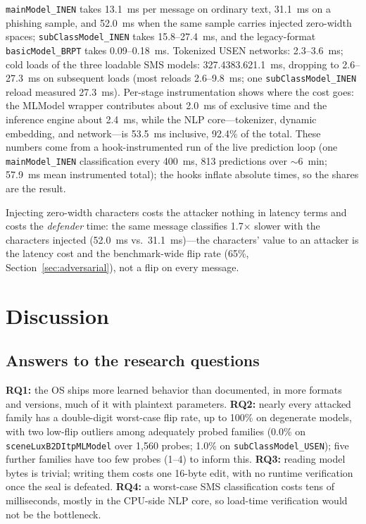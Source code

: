 \documentclass[letterpaper,twocolumn,10pt]{article}
\begin{document}
\texttt{mainModel\_}\allowbreak\texttt{INEN} takes 13.1~ms per message on ordinary text,
31.1~ms on a phishing sample, and 52.0~ms when the same sample carries
injected zero-width spaces; \texttt{subClassModel\_}\allowbreak\texttt{INEN} takes
15.8--27.4~ms, and the legacy-format \texttt{basicModel\_}\allowbreak\texttt{BRPT} takes
0.09--0.18~ms.
Tokenized USEN networks: 2.3--3.6~ms; cold loads of the three loadable
SMS models: 327.4\text{/}383.6\text{/}21.1~ms, dropping to 2.6--27.3~ms on
subsequent loads (most reloads 2.6--9.8~ms; one
\texttt{subClassModel\_}\allowbreak\texttt{INEN} reload measured 27.3~ms).
Per-stage instrumentation shows where the cost goes: the MLModel wrapper
contributes about 2.0~ms of exclusive time and the inference engine about
2.4~ms, while the NLP core---tokenizer, dynamic embedding, and network---is
53.5~ms inclusive, 92.4\% of the total.
These numbers come from a hook-instrumented run of the live prediction loop
(one \texttt{mainModel\_}\allowbreak\texttt{INEN} classification every 400~ms, 813
predictions over ${\sim}6$~min; 57.9~ms mean instrumented total); the
hooks inflate absolute times, so the shares are the result.

Injecting zero-width characters costs the attacker nothing in
latency terms and costs the \emph{defender} time: the same message
classifies 1.7$\times$ slower with the characters injected (52.0~ms
vs.~31.1~ms)---the characters' value to an attacker is the latency cost and
the benchmark-wide flip rate (65\%, Section~\ref{sec:adversarial}), not a
flip on every message.

\section{Discussion}
\label{sec:discussion}

\subsection{Answers to the research questions}

\textbf{RQ1:} the OS ships more learned behavior than documented, in more
formats and versions, much of it with plaintext parameters.
\textbf{RQ2:} nearly every attacked family has a double-digit worst-case
flip rate, up to 100\% on degenerate models, with two low-flip outliers
among adequately probed families (0.0\% on \texttt{sceneLux}\allowbreak\texttt{B2DItpMLModel}
over 1{,}560 probes; 1.0\% on \texttt{subClassModel\_USEN}); five further
families have too few probes (1--4) to inform this.
\textbf{RQ3:} reading model bytes is trivial; writing them costs one
16-byte edit, with no runtime verification once the seal is defeated.
\textbf{RQ4:} a worst-case SMS classification costs tens of milliseconds,
mostly in the CPU-side NLP core, so load-time verification would not be the
bottleneck.
\end{document}

